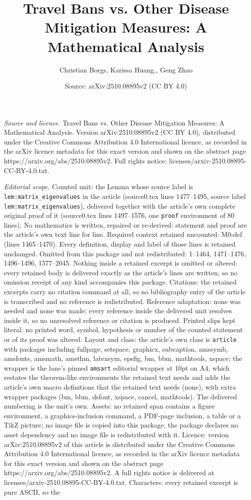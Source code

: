\documentclass[10pt,a4paper]{amsart}
\title[Travel Bans vs. Other Disease Mitigation Measures: A Mathema]{Travel Bans vs. Other Disease Mitigation Measures: A Mathematical Analysis}
\author{Christian Borgs, Karissa Huang,, Geng Zhao}
\date{Source: arXiv:2510.08895v2 (CC BY 4.0)}
\begin{document}
\maketitle

\noindent\emph{Source and licence.} Travel Bans vs. Other Disease Mitigation Measures: A Mathematical Analysis. Version arXiv:2510.08895v2 (CC BY 4.0), distributed under the Creative Commons Attribution 4.0 International licence, as recorded in the arXiv licence metadata for this exact version and shown on the abstract page https://arxiv.org/abs/2510.08895v2. Full rights notice: licenses/arxiv-2510.08895-CC-BY-4.0.txt.\par\smallskip

\noindent\textit{Editorial scope.} Counted unit: the Lemma whose source label is \texttt{lem:matrix\_eigenvalues} in the article (source0.tex lines 1477--1495, source label \texttt{lem:matrix\_eigenvalues}), delivered together with the article's own complete original proof of it (source0.tex lines 1497--1576, one \texttt{proof} environment of 80 lines). No mathematics is written, repaired or re-derived: statement and proof are the article's own text line for line. Required context retained uncounted: M0-def (lines 1465--1470). Every definition, display and label of those lines is retained unchanged. Omitted from this package and not redistributed: 1--1464, 1471--1476, 1496--1496, 1577--2045. Nothing inside a retained excerpt is omitted or altered: every retained body is delivered exactly as the article's lines are written, so no omission receipt of any kind accompanies this package. Citations: the retained excerpts carry no citation command at all, so no bibliography entry of the article is transcribed and no reference is redistributed. Reference adaptation: none was needed and none was made; every reference inside the delivered unit resolves inside it, so no unresolved reference or citation is produced. Printed slips kept literal: no printed word, symbol, hypothesis or number of the counted statement or of its proof was altered. Layout and class: the article's own class is \texttt{article} with packages including fullpage, setspace, graphicx, subcaption, amssymb, amsfonts, amsmath, amsthm, latexsym, epsfig, bm, bbm, mathtools, xspace; the wrapper is the lane's pinned \texttt{amsart} editorial wrapper at 10pt on A4, which restates the theorem-like environments the retained text needs and adds the article's own macro definitions that the retained text needs (none), with extra wrapper packages (bm, bbm, dsfont, xspace, cancel, mathtools). The delivered numbering is the unit's own. Assets: no retained span contains a figure environment, a graphics-inclusion command, a PDF-page inclusion, a table or a TikZ picture; no image file is copied into this package, the package declares no asset dependency and no image file is redistributed with it. Licence: version arXiv:2510.08895v2 of this article is distributed under the Creative Commons Attribution 4.0 International licence, as recorded in the arXiv licence metadata for this exact version and shown on the abstract page https://arxiv.org/abs/2510.08895v2. A full rights notice is delivered at licenses/arxiv-2510.08895-CC-BY-4.0.txt. Characters: every retained excerpt is pure ASCII, so the 
\end{document}
